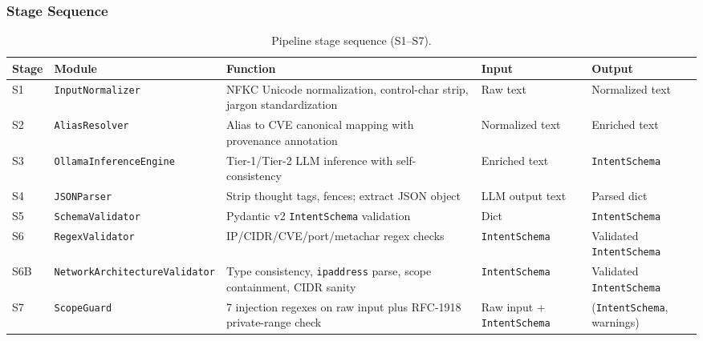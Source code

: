 \documentclass[10pt,journal,onecolumn]{IEEEtran}
\begin{document}
\subsubsection{Stage Sequence}
\begin{table}[t]
\caption{Pipeline stage sequence (S1--S7).}
\label{tab:stages}
\begin{tabularx}{\textwidth}{l l X X X}
\toprule
\textbf{Stage} & \textbf{Module} & \textbf{Function} & \textbf{Input} & \textbf{Output}\\
\midrule
S1 & \texttt{InputNormalizer} & NFKC Unicode normalization, control-char strip, jargon standardization & Raw text & Normalized text\\
S2 & \texttt{AliasResolver} & Alias to CVE canonical mapping with provenance annotation & Normalized text & Enriched text\\
S3 & \texttt{OllamaInferenceEngine} & Tier-1/Tier-2 LLM inference with self-consistency & Enriched text & \texttt{IntentSchema}\\
S4 & \texttt{JSONParser} & Strip thought tags, fences; extract JSON object & LLM output text & Parsed dict\\
S5 & \texttt{SchemaValidator} & Pydantic v2 \texttt{IntentSchema} validation & Dict & \texttt{IntentSchema}\\
S6 & \texttt{RegexValidator} & IP/CIDR/CVE/port/metachar regex checks & \texttt{IntentSchema} & Validated \texttt{IntentSchema}\\
S6B & \texttt{NetworkArchitectureValidator} & Type consistency, \texttt{ipaddress} parse, scope containment, CIDR sanity & \texttt{IntentSchema} & Validated \texttt{IntentSchema}\\
S7 & \texttt{ScopeGuard} & 7 injection regexes on raw input plus RFC-1918 private-range check & Raw input + \texttt{IntentSchema} & (\texttt{IntentSchema}, warnings)\\
\bottomrule
\end{tabularx}
\end{table}
\end{document}
